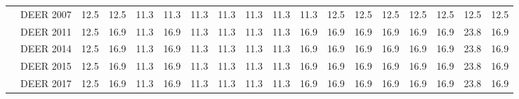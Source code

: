 \begin{table}
\begin{tabular}{p{0.4in}p{0.7in}p{0.1in}p{0.1in}p{0.1in}p{0.1in}p{0.1in}p{0.1in}p{0.1in}p{0.1in}p{0.1in}p{0.1in}p{0.1in}p{0.1in}p{0.1in}p{0.1in}p{0.1in}p{0.1in}}
            & DEER 2007     & 12.5 & 12.5 & 11.3 & 11.3 & 11.3 & 11.3 & 11.3 & 11.3 & 11.3 & 12.5 & 12.5 & 12.5 & 12.5 & 12.5 & 12.5 & 12.5                    \\
            & DEER 2011     & 12.5 & 16.9 & 11.3 & 16.9 & 11.3 & 11.3 & 11.3 & 11.3 & 16.9 & 16.9 & 16.9 & 16.9 & 16.9 & 16.9 & 23.8 & 16.9                    \\
            & DEER 2014     & 12.5 & 16.9 & 11.3 & 16.9 & 11.3 & 11.3 & 11.3 & 11.3 & 16.9 & 16.9 & 16.9 & 16.9 & 16.9 & 16.9 & 23.8 & 16.9                    \\
            & DEER 2015     & 12.5 & 16.9 & 11.3 & 16.9 & 11.3 & 11.3 & 11.3 & 11.3 & 16.9 & 16.9 & 16.9 & 16.9 & 16.9 & 16.9 & 23.8 & 16.9                    \\
            & DEER 2017     & 12.5 & 16.9 & 11.3 & 16.9 & 11.3 & 11.3 & 11.3 & 11.3 & 16.9 & 16.9 & 16.9 & 16.9 & 16.9 & 16.9 & 23.8 & 16.9                   
\end{tabular}
\end{table}